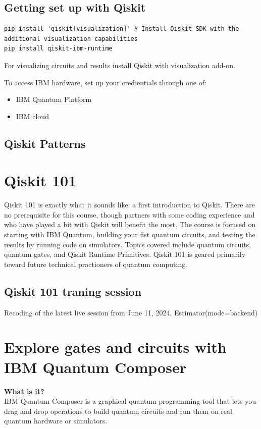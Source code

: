 \subsection{Getting set up with Qiskit}
\begin{lstlisting}
pip install 'qiskit[visualization]' # Install Qiskit SDK with the additional visualization capabilities
pip install qiskit-ibm-runtime
\end{lstlisting}

For visualizing circuits and results install Qiskit with visualization add-on.

To access IBM hardware, set up your credientials through one of:
\begin{itemize}
    \item IBM Quantum Platform
    \item IBM cloud
\end{itemize}

\subsection{Qiskit Patterns}

\section{Qiskit 101}
Qiskit 101 is exactly what it sounds like: a first introduction to Qiskit. There are no prerequisite for this course, though partners with some coding experience and who have played a bit with Qiskit will benefit the most. The course is focused on starting with IBM Quantum, building your fist quantum circuits, and testing the results by running code on simulators. Topics covered include quantum circuits, quantum gates, and Qiskit Runtime Primitives. Qiskit 101 is geared primarily toward future technical practioners of quantum computing.

\subsection{Qiskit 101 traning session}
Recoding of the latest live session from June 11, 2024. Estimator(mode=backend)

\section{Explore gates and circuits with IBM Quantum Composer}
\textbf{What is it?}\\
IBM Quantum Composer is a graphical quantum programming tool that lets you drag and drop operations to build quantum circuits and run them on real quantum hardware or simulators.

